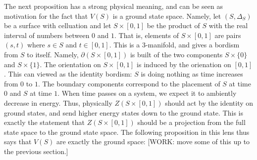 \documentclass{article}
\theoremstyle{definition}
\numberwithin{figure}{section}
\begin{document}
The next proposition has a strong physical meaning, and can be seen as motivation for the fact that $V(S)$ is a ground state space. Namely, let $(S,\Delta_S)$ be a surface with celluation and let $S\times [0,1]$ be the product of $S$ with the real interval of numbers between $0$ and $1$. That is, elements of $S\times [0,1]$ are pairs $(s,t)$ where $s\in S$ and $t\in [0,1]$. This is a $3$-manifold, and gives a bordism from $S$ to itself. Namely, $\partial (S\times [0,1])$ is built of the two components $S\times \{0\}$ and $S\times \{1\}$. The orientation on $S\times [0,1]$ is induced by the orienation on $[0,1]$. This can viewed as the identity bordism: $S$ is doing nothing as time increases from $0$ to $1$. The boundary components correspond to the placement of $S$ at time $0$ and $S$ at time $1$. When time passes on a system, we expect it to ambiently decrease in energy. Thus,  physically $Z(S\times [0,1])$ should act by the identity on ground states, and send higher energy states down to the ground state. This is exactly the statement that $Z(S\times [0,1])$ should be a projection from the full state space to the ground state space. The following proposition in this lens thus says that $V(S)$ are exactly the ground space: [WORK: move some of this up to the previous section.]
\end{document}
